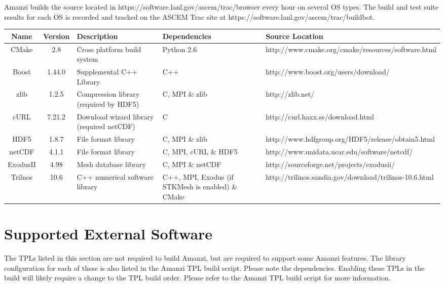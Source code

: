 \documentclass[12pt]{article}
\begin{document}
Amanzi builds the source located in https://software.lanl.gov/ascem/trac/browser every hour on several OS types.
The build and test suite results for each OS is recorded and tracked on the ASCEM Trac
site at https://software.lanl.gov/ascem/trac/buildbot. 

\begin{table}[htdp]
\begin{center}
\begin{tabular}{|c|c|p{3cm}|p{3cm}|p{3cm}|}
\hline
\hline
Name & Version & Description & Dependencies & Source Location \\
\hline
CMake & 2.8 & Cross platform build system & Python 2.6 & http://www.cmake.org/cmake/resources/software.html \\
\hline
Boost & 1.44.0 & Supplemental C++ Library & C++ &  http://www.boost.org/users/download/\\
\hline
zlib & 1.2.5 &Compression library (required by HDF5) & C, MPI \& zlib &  http://zlib.net/ \\
\hline
cURL & 7.21.2 & Download wizard library (required netCDF) & C & http://curl.haxx.se/download.html \\
\hline
HDF5 &1.8.7 & File format library & C, MPI \& zlib & http://www.hdfgroup.org/HDF5/release/obtain5.html \\
\hline
netCDF & 4.1.1 & File format library & C, MPI, cURL \& HDF5 & http://www.unidata.ucar.edu/software/netcdf/ \\
\hline
ExodusII & 4.98 & Mesh database library & C, MPI \& netCDF & http://sourceforge.net/projects/exodusii/\\
\hline
Trilnos & 10.6 & C++ numerical software library & C++, MPI, Exodus (if STKMesh is enabled) \& CMake & http://trilinos.sandia.gov/download/trilinos-10.6.html \\
\hline
\hline
\end{tabular}
\end{center}
\label{default}
\end{table}%


\section*{Supported External Software}
The TPLs listed in this section are not required to build Amanzi, but are required to support some Amanzi features. The 
library configuration for each of these is also listed in the Amanzi TPL build script. Please note the dependencies. Enabling
these TPLs in the build will likely require a change to the TPL build order. Please refer to the Amanzi TPL build script for
more information.
\end{document}
